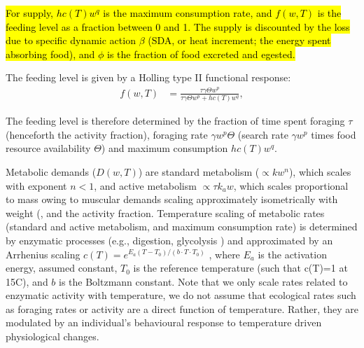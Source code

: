 \documentclass[11pt]{article}\usepackage[]{graphicx}\usepackage[]{color,soul}
\begin{document}
\hl{ For supply, $h c(T) w^q$ is the maximum consumption rate, and $f(w,T)$ is the feeding level as a fraction between 0 and 1. The supply is discounted by the loss due to specific dynamic action  $\beta$ (SDA, or heat increment; the energy spent absorbing food), and $\phi$ is the fraction of food excreted and egested.} 

The feeding level is given by a Holling type II functional response:
\begin{align}
  f(w,T) &= \frac{\tau \gamma\Theta w^{p} }{\tau \gamma\Theta w^{p} + h c(T) w^q}, \label{eq:f} 
\end{align}

The feeding level is therefore determined by the fraction of time spent foraging $\tau$ (henceforth the activity fraction), foraging rate $\gamma w^p \Theta$ (search rate $\gamma w^p$ times food resource availability $\Theta$) and maximum consumption $h c(T) w^q$.


Metabolic demands ($D(w,T)$) are standard metabolism ($\propto k w^n$), which scales with exponent $n<1$, and active metabolism $\propto \tau k_a w$, which scales proportional to mass owing to muscular demands scaling approximately isometrically with weight (\citealt{glazier_activity_2009,brett_1965_relation}, and the activity fraction. Temperature scaling of metabolic rates (standard and active metabolism, and maximum consumption rate) is determined by enzymatic processes (e.g., digestion, glycolysis \citealt{jeschke_predator_2002, sentis_parsing_2013}) and approximated by an Arrhenius scaling $c(T) = e^{E_a(T-T_0)/(b\cdot T\cdot T_0)}$ \cite{gilloolyeffects2001}, where $E_a$ is the activation energy, assumed constant, $T_0$ is the reference temperature (such that c(T)=1 at 15\degree C), and $b$ is the Boltzmann constant. Note that we only scale rates related to enzymatic activity with temperature, we do not assume that ecological rates such as foraging rates or activity are a direct function of temperature. Rather, they are modulated by an individual's behavioural response to temperature driven physiological changes.
\end{document}
